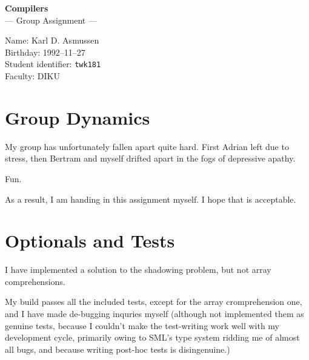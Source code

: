 \documentclass[12pt, a4paper]{article}
\begin{document}
\thispagestyle{empty}

\begin{center}
\textbf{\Huge Compilers}\\
\huge --- Group Assignment ---
\end{center}
\vspace{2em}

\begin{center}
\begin{minipage}{0.7\textwidth}
\LARGE Name: Karl D. Asmussen\\[1em]
Birthday: 1992--11--27\\[1em]
Student identifier: \texttt{twk181} \\[1em]
Faculty: DIKU
\end{minipage}
\end{center}

\pagebreak

\setcounter{page}{1}
\tableofcontents

\pagebreak

\section{Group Dynamics}

My group has unfortunately fallen apart quite hard. First Adrian left due to stress,
then Bertram and myself drifted apart in the fogs of depressive apathy.

Fun.

As a result, I am handing in this assignment myself. I hope that is acceptable.

\section{Optionals and Tests}

I have implemented a solution to the shadowing problem, but not array comprehensions.

My build passes all the included tests, except for the array cromprehension one, and
I have made de-bugging inquries myself (although not implemented them as genuine tests,
because I couldn't make the test-writing work well with my development cycle, primarily
owing to SML's type system ridding me of almost all bugs, and because writing post-hoc
tests is disingenuine.)
\end{document}
